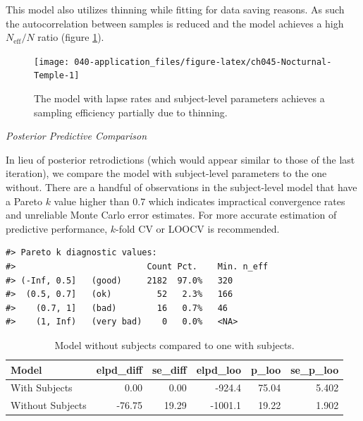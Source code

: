 \documentclass[11pt, oneside, openany]{scrbook}
\begin{document}
This model also utilizes thinning while fitting for data saving reasons. As such the autocorrelation between samples is reduced and the model achieves a high \(N_{\mathrm{eff}}/N\) ratio (figure \ref{fig:ch045-Nocturnal-Temple}).

\begin{figure}

{\centering \texttt{[image: 040-application\_files/figure-latex/ch045-Nocturnal-Temple-1]} 

}

\caption{The model with lapse rates and subject-level parameters achieves a sampling efficiency partially due to thinning.}\label{fig:ch045-Nocturnal-Temple}
\end{figure}

\emph{Posterior Predictive Comparison}

In lieu of posterior retrodictions (which would appear similar to those of the last iteration), we compare the model with subject-level parameters to the one without. There are a handful of observations in the subject-level model that have a Pareto \(k\) value higher than \(0.7\) which indicates impractical convergence rates and unreliable Monte Carlo error estimates. For more accurate estimation of predictive performance, \(k\)-fold CV or LOOCV is recommended.


\begin{verbatim}
#> Pareto k diagnostic values:
#>                          Count Pct.    Min. n_eff
#> (-Inf, 0.5]   (good)     2182  97.0%   320       
#>  (0.5, 0.7]   (ok)         52   2.3%   166       
#>    (0.7, 1]   (bad)        16   0.7%   46        
#>    (1, Inf)   (very bad)    0   0.0%   <NA>
\end{verbatim}


\begin{table}[!h]

\caption{\label{tab:ch045-Deserted-Fish}Model without subjects compared to one with subjects.}
\centering
\begin{tabular}[t]{lrrrrr}
\toprule
Model & elpd\_diff & se\_diff & elpd\_loo & p\_loo & se\_p\_loo\\
\midrule
With Subjects & 0.00 & 0.00 & -924.4 & 75.04 & 5.402\\
Without Subjects & -76.75 & 19.29 & -1001.1 & 19.22 & 1.902\\
\bottomrule
\end{tabular}
\end{table}
\end{document}
